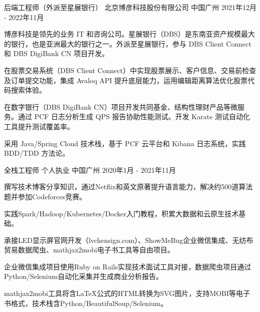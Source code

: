 \begin{cventries}
  \cventry
    {后端工程师（外派至星展银行）} %
    {北京博彦科技股份有限公司} %
    {中国广州} %
    {2021年12月 - 2022年11月} %
    {
      \begin{cvitems} %
        \item {博彦科技是领先的业务 IT 和咨询公司。星展银行（DBS）是东南亚资产规模最大的银行，也是亚洲最大的银行之一。外派至星展银行，参与 DBS Client Connect 和 DBS DigiBank CN 项目开发。}
        \item {在股票交易系统（DBS Client Connect）中实现股票展示、客户信息、交易前检查及订单提交功能，集成 Avaloq API 提升底层能力，运用编辑距离算法优化股票代码搜索体验。}
        \item {在数字银行（DBS DigiBank CN）项目开发共同基金、结构性理财产品等微服务。通过 PCF 日志分析生成 QPS 报告协助性能测试。开发 Karate 测试自动化工具提升测试覆盖率。}
        \item {采用 Java/Spring Cloud 技术栈，基于 PCF 云平台和 Kibana 日志系统，实践 BDD/TDD 方法论。}
      \end{cvitems}
    }

\cventry
{全栈工程师} %
{个人执业} %
{中国广州} %
{2020年1月 - 2021年11月} %
{
  \begin{cvitems} %
    \item {撰写技术博客分享知识，通过Netflix和英文原著提升语言能力，解决约500道算法题并参加Codeforces竞赛。}
    \item {实践Spark/Hadoop/Kubernetes/Docker入门教程，积累大数据和云原生技术基础。}
    \item {承接LED显示屏官网开发（lvchensign.com）、ShowMeBug企业微信集成、无纺布贸易数据爬虫、mathjax2mobi电子书工具等自由项目。}
    \item {企业微信集成项目使用Ruby on Rails实现技术面试工具对接，数据爬虫项目通过Python/Selenium自动化采集并生成商业分析报告。}
    \item {mathjax2mobi工具将含LaTeX公式的HTML转换为SVG图片，支持MOBI等电子书格式，技术栈含Python/BeautifulSoup/Selenium。}
  \end{cvitems}
}


\end{cventries}
